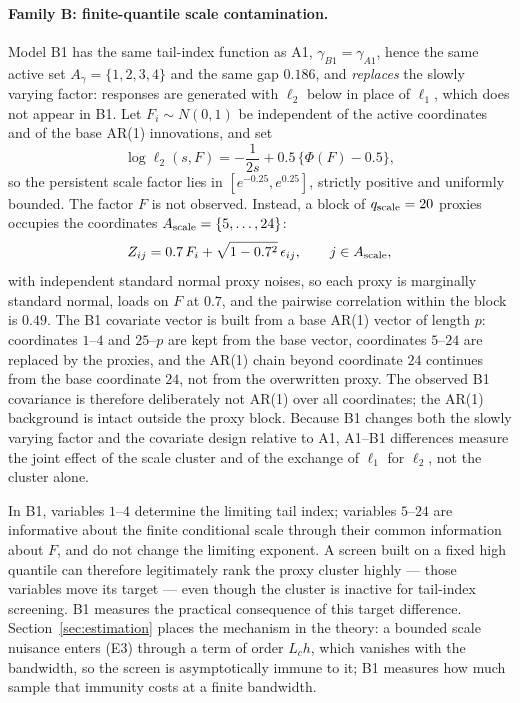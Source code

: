 \documentclass[bj,authoryear]{imsart}
\theoremstyle{plain}
\newcommand{\A}{A}\newcommand{\I}{I_\varepsilon}
\begin{document}
\paragraph{Family B: finite-quantile scale contamination.}
Model B1 has the same tail-index function as A1,
$\gamma_{B1}=\gamma_{A1}$, hence the same active set
$\A_\gamma=\{1,2,3,4\}$ and the same gap $0.186$, and \emph{replaces}
the slowly varying factor: responses are generated with $\ell_2$ below
in place of $\ell_1$, which does not appear in B1. Let
$F_i\sim N(0,1)$ be independent of the active coordinates and of the
base AR(1) innovations, and set
\[
 \log\ell_2(s,F)=-\frac1{2s}+0.5\,\bigl\{\Phi(F)-0.5\bigr\},
\]
so the persistent scale factor lies in $[e^{-0.25},e^{0.25}]$, strictly
positive and uniformly bounded. The factor $F$ is not observed. Instead,
a block of $q_{\rm scale}=20$ proxies occupies the coordinates
$\A_{\rm scale}=\{5,\ldots,24\}$:
\[
 Z_{ij}=0.7\,F_i+\sqrt{1-0.7^2}\,\epsilon_{ij},
 \qquad j\in\A_{\rm scale},
\]
with independent standard normal proxy noises, so each proxy is
marginally standard normal, loads on $F$ at $0.7$, and the pairwise
correlation within the block is $0.49$. The B1 covariate vector is
built from a base AR(1) vector of length $p$: coordinates $1$--$4$ and
$25$--$p$ are kept from the base vector, coordinates $5$--$24$ are
replaced by the proxies, and the AR(1) chain beyond coordinate $24$
continues from the base coordinate $24$, not from the overwritten
proxy. The observed B1 covariance is therefore deliberately not AR(1)
over all coordinates; the AR(1) background is intact outside the proxy
block. Because B1 changes both the slowly varying factor and the
covariate design relative to A1, A1--B1 differences measure the joint
effect of the scale cluster and of the exchange of $\ell_1$ for
$\ell_2$, not the cluster alone.

In B1, variables $1$--$4$ determine the limiting tail index; variables
$5$--$24$ are informative about the finite conditional scale through
their common information about $F$, and do not change the limiting
exponent. A screen built on a fixed high quantile can therefore
legitimately rank the proxy cluster highly --- those variables move its
target --- even though the cluster is inactive for tail-index
screening. B1 measures the practical consequence of this target
difference. Section~\ref{sec:estimation} places the mechanism in the
theory: a bounded scale nuisance enters (E3) through a term of order
$L_ch$, which vanishes with the bandwidth, so the screen is
asymptotically immune to it; B1 measures how much sample that immunity
costs at a finite bandwidth.
\end{document}
